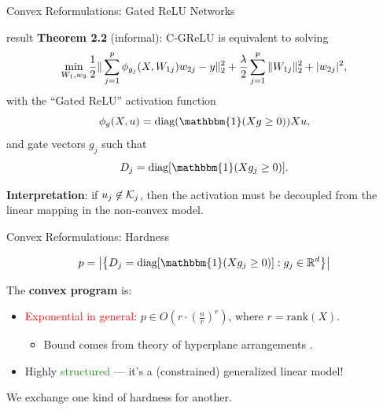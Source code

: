 \documentclass[usenames,dvipsnames,mathserif,notheorems]{beamer}
\newcommand{\red}[1]{\textcolor{Red}{#1}}
\newcommand{\green}[1]{\textcolor{ForestGreen}{#1}}
\begin{document}
\begin{frame}{Convex Reformulations: Gated ReLU Networks}

	\begin{beamercolorbox}[wd=\textwidth,sep=1em]{result}
		\textbf{Theorem 2.2} (informal): C-GReLU is equivalent to solving
		\[
			\min_{W_1, w_2} \frac 1 2 \|\sum_{j=1}^p \phi_{g_j}(X, W_{1j})w_{2j} - y\|_2^2 + \frac{\lambda}{2} \sum_{j=1}^p \|W_{1j}\|_2^2 + |w_{2j}|^2,
		\]
		with the ``Gated ReLU'' \citep{fiat2019decoupling} activation function
		\[ \phi_{g}(X, u) = \text{diag}(\mathbbm{1}(Xg \geq 0)) X u, \]
		and gate vectors \( g_j \) such that
		\[
			D_j = \text{diag}[\mathbbm{1}(X g_j \geq 0)].
		\]
	\end{beamercolorbox}
	\pause

	\textbf{Interpretation}: if \( u_j \not \in \mathcal{K}_j \), then the activation
	must be decoupled from the linear mapping in the non-convex model.

\end{frame}


\begin{frame}{Convex Reformulations: Hardness}


	\[
		p = \abs{\cbr{D_j = \text{diag}[\mathbbm{1}(X g_j \geq 0)] : g_j \in \R^d }}
	\]

	\vspace{2em}
	\pause

	The \textbf{convex program} is:
	\vspace{0.5em}
	\begin{itemize}
		\item \red{Exponential in general}: \( p \in O(r \cdot (\frac{n}{r})^r) \),
		      where \( r = \text{rank}(X) \).
		      \vspace{0.25em}
		      \begin{itemize}
			      \item Bound comes from theory of hyperplane arrangements \citep{winder1966partitions}.
		      \end{itemize}
		      \pause

		      \vspace{0.5em}

		\item Highly \green{structured} --- it's a (constrained) generalized linear model!
	\end{itemize}

	\vspace{1em}
	\pause

	\begin{center}
		\Large
		We exchange one kind of hardness for another.
	\end{center}

\end{frame}
\end{document}
